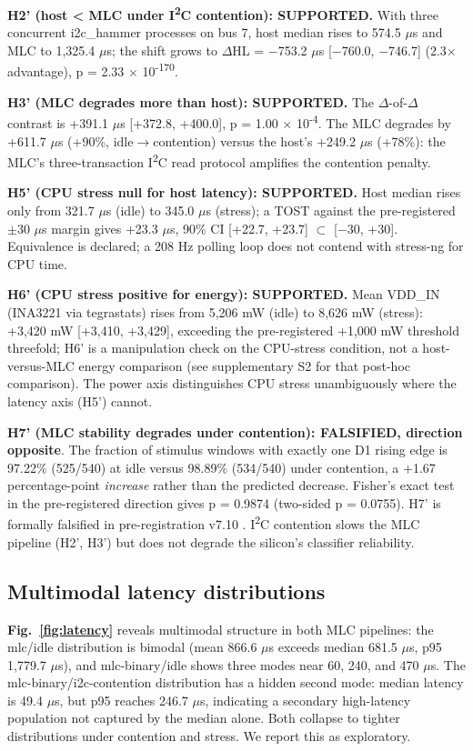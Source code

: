 \textbf{H2' (host \textless{} MLC under I\textsuperscript{2}C contention): SUPPORTED.} With three concurrent i2c\_hammer processes on bus 7, host median rises to 574.5 $\mu$s and MLC to 1,325.4 $\mu$s; the shift grows to $\Delta$HL = $-$753.2 $\mu$s [$-$760.0, $-$746.7] (2.3$\times$ advantage), p = 2.33 $\times$ 10\textsuperscript{-170}.

\textbf{H3' (MLC degrades more than host): SUPPORTED.} The $\Delta$-of-$\Delta$ contrast is +391.1 $\mu$s [+372.8, +400.0], p = 1.00 $\times$ 10\textsuperscript{-4}. The MLC degrades by +611.7 $\mu$s (+90\%, idle$\rightarrow$contention) versus the host's +249.2 $\mu$s (+78\%): the MLC's three-transaction I\textsuperscript{2}C read protocol amplifies the contention penalty.

\textbf{H5' (CPU stress null for host latency): SUPPORTED.} Host median rises only from 321.7 $\mu$s (idle) to 345.0 $\mu$s (stress); a TOST against the pre-registered $\pm$30 $\mu$s margin gives +23.3 $\mu$s, 90\% CI [+22.7, +23.7] $\subset$ [$-$30, +30]. Equivalence is declared; a 208 Hz polling loop does not contend with stress-ng for CPU time.

\textbf{H6' (CPU stress positive for energy): SUPPORTED.} Mean VDD\_IN (INA3221 via tegrastats) rises from 5,206 mW (idle) to 8,626 mW (stress): +3,420 mW [+3,410, +3,429], exceeding the pre-registered +1,000 mW threshold threefold; H6' is a manipulation check on the CPU-stress condition, not a host-versus-MLC energy comparison (see supplementary S2 for that post-hoc comparison). The power axis distinguishes CPU stress unambiguously where the latency axis (H5') cannot.

\textbf{H7' (MLC stability degrades under contention): FALSIFIED, direction opposite}. The fraction of stimulus windows with exactly one D1 rising edge is 97.22\% (525/540) at idle versus 98.89\% (534/540) under contention, a +1.67 percentage-point \emph{increase} rather than the predicted decrease. Fisher's exact test in the pre-registered direction gives p = 0.9874 (two-sided p = 0.0755). H7' is formally falsified in pre-registration v7.10 \cite{ref4}. I\textsuperscript{2}C contention slows the MLC pipeline (H2', H3') but does not degrade the silicon's classifier reliability.

\subsection{Multimodal latency distributions}

\textbf{Fig.~\ref{fig:latency}} reveals multimodal structure in both MLC pipelines: the mlc/idle distribution is bimodal (mean 866.6 $\mu$s exceeds median 681.5 $\mu$s, p95 1,779.7 $\mu$s), and mlc-binary/idle shows three modes near 60, 240, and 470 $\mu$s. The mlc-binary/i2c-contention distribution has a hidden second mode: median latency is 49.4 $\mu$s, but p95 reaches 246.7 $\mu$s, indicating a secondary high-latency population not captured by the median alone. Both collapse to tighter distributions under contention and stress. We report this as exploratory.

